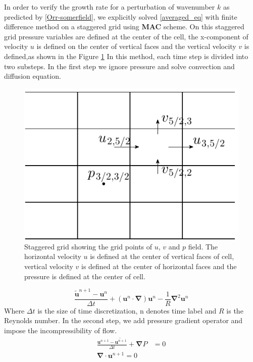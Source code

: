 \documentclass[12pt]{report}   %
\newcommand{\bu}{\mathbf{u}}
\newcommand{\grad}{\mathbf{\nabla}}
\begin{document}
In order to verify the growth rate for a perturbation of wavenumber $k$ as predicted by \eqref{Orr-somerfield}, we explicitly solved  
\eqref{averaged_eq} with finite difference method on a staggered grid using {\bf{MAC}} scheme. On this staggered grid pressure variables are defined at the center of the cell, the x-component of velocity $u$ is defined on the center of vertical faces and the vertical velocity $v$ is defined,as shown in the Figure \ref{staggered}
In this method, each time step is divided into two substeps. In the first step we ignore pressure and solve convection and diffusion equation.
\begin{figure}
\centerline{\includegraphics{StaggardGrid}}
\caption{Staggered grid showing the grid points of $u$, $v$ and $p$ field. The horizontal velocity $u$ is defined at the center of vertical faces of cell, vertical velocity $v$ is defined at the center of horizontal faces and the pressure is defined at the center of cell.   }
\label{staggered}
\end{figure}
\begin{equation}
\frac{\tilde{\bu}^{n+1}-\bu^{n}}{\Delta t}+(\bu^n \cdot \grad )\bu^n - \frac{1}{R} \grad^2 \bu^n
\label{TransportEq}
\end{equation}
Where $\Delta t$ is the size of time discretization, n denotes time label and $R$ is the Reynolds number. In the second step, we add pressure gradient operator and impose the incompressibility of flow.
\begin{equation}
\begin{split}
 \frac{\bu^{n+1}-\tilde{\bu^{n+1}}}{\Delta t} +\grad P &= 0\\
 \grad \cdot \bu^{n+1} = 0
 \label{IncompressibleCondEq}
 \end{split}
\end{equation}
\end{document}
